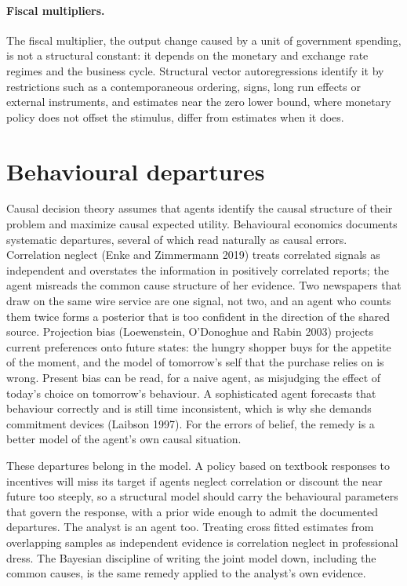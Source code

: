 \paragraph{Fiscal multipliers.} The fiscal multiplier, the output change caused by a unit of government spending, is not a structural constant: it depends on the monetary and exchange rate regimes and the business cycle. Structural vector autoregressions identify it by restrictions such as a contemporaneous ordering, signs, long run effects or external instruments, and estimates near the zero lower bound, where monetary policy does not offset the stimulus, differ from estimates when it does. 

\section{Behavioural departures}\label{cdt:sec:behavioural}

Causal decision theory assumes that agents identify the causal structure of their problem and maximize causal expected utility. Behavioural economics documents systematic departures, several of which read naturally as causal errors. Correlation neglect (Enke and Zimmermann 2019) treats correlated signals as independent and overstates the information in positively correlated reports; the agent misreads the common cause structure of her evidence. Two newspapers that draw on the same wire service are one signal, not two, and an agent who counts them twice forms a posterior that is too confident in the direction of the shared source. Projection bias (Loewenstein, O'Donoghue and Rabin 2003) projects current preferences onto future states: the hungry shopper buys for the appetite of the moment, and the model of tomorrow's self that the purchase relies on is wrong. Present bias can be read, for a naive agent, as misjudging the effect of today's choice on tomorrow's behaviour. A sophisticated agent forecasts that behaviour correctly and is still time inconsistent, which is why she demands commitment devices (Laibson 1997). For the errors of belief, the remedy is a better model of the agent's own causal situation.

These departures belong in the model. A policy based on textbook responses to incentives will miss its target if agents neglect correlation or discount the near future too steeply, so a structural model should carry the behavioural parameters that govern the response, with a prior wide enough to admit the documented departures. The analyst is an agent too. Treating cross fitted estimates from overlapping samples as independent evidence is correlation neglect in professional dress. The Bayesian discipline of writing the joint model down, including the common causes, is the same remedy applied to the analyst's own evidence.


